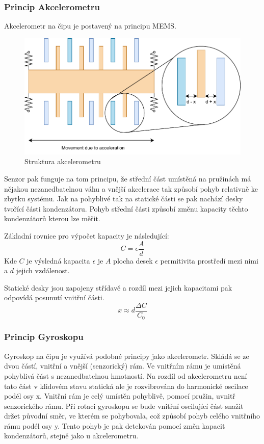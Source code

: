 \subsubsection*{Princip Akcelerometru}
Akcelerometr na čipu je postavený na principu MEMS. 

\begin{figure}[h!]
	\centering
	\includegraphics[scale=0.8]{obrazky-figures/accelerometer.pdf}
	\caption{Struktura akcelerometru}
	\label{}
\end{figure}

Senzor pak funguje na tom principu, že střední část umístěná na pružinách má nějakou nezanedbatelnou váhu a vnější akcelerace tak způsobí pohyb relativně ke zbytku systému. Jak na pohyblivé tak na statické části se pak nachází desky tvořící části kondenzátoru. Pohyb střední části způsobí změnu kapacity těchto kondenzátorů kterou lze měřit.

Základní rovnice pro výpočet kapacity je následující:
$$C = \epsilon \frac{A}{d}$$
Kde $C$ je výsledná kapacita $\epsilon$ je $A$ plocha desek $\epsilon$ permitivita prostředí mezi nimi a $d$ jejich vzdálenost.

Statické desky jsou zapojeny střídavě a rozdíl mezi jejich kapacitami pak odpovídá posunutí vnitřní části.
$$x \approx d \frac{\Delta C}{C_0}$$

\subsubsection{Princip Gyroskopu}
Gyroskop na čipu je využívá podobné principy jako akcelerometr. Skládá se ze dvou částí, vnitřní a vnější (senzorický) rám. Ve vnitřním rámu je umístěná pohyblivá část s nezanedbatelnou hmotností. Na rozdíl od akcelerometru není tato část v klidovém stavu statická ale je rozvibrována do harmonické oscilace podél osy x.
Vnitřní rám je celý umístěn pohyblivě, pomocí pružin, uvnitř senzorického rámu. Při rotaci gyroskopu se bude vnitřní oscilující část snažit držet původní směr, ve kterém se pohybovala, což způsobí pohyb celého vnitřního rámu podél osy y. Tento pohyb je pak detekován pomocí změn kapacit kondenzátorů, stejně jako u akcelerometru. 

